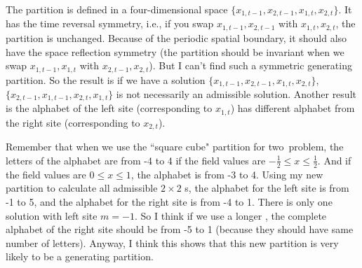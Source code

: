 \begin{description}
{The partition is defined in a four-dimensional space
$\{x_{1,t-1},x_{2,t-1},x_{1,t},x_{2,t}\}$. It has the time reversal
symmetry, i.e., if you swap $x_{1,t-1},x_{2,t-1}$ with $x_{1,t},x_{2,t}$,
the partition is unchanged. Because of the periodic spatial boundary, it
should also have the space reflection symmetry (the partition should be
invariant when we swap $x_{1,t-1},x_{1,t}$ with $x_{2,t-1},x_{2,t}$). But
I can't find such a symmetric generating partition. So the result is if
we have a solution $\{x_{1,t-1},x_{2,t-1},x_{1,t},x_{2,t}\}$,
$\{x_{2,t-1},x_{1,t-1},x_{2,t},x_{1,t}\}$ is not necessarily an
admissible solution. Another result is the alphabet of the left site
(corresponding to $x_{1,t}$) has different alphabet from the right site
(corresponding to $x_{2,t}$).

Remember that when we use the ``square cube" partition for two\dmn\
problem, the letters of the alphabet are from -4 to 4 if the field values
are $-\frac{1}{2}\leq x \leq \frac{1}{2}$. And if the field values are
$0\leq x \leq 1$, the alphabet is from -3 to 4. Using my new partition to
calculate all admissible $2\times 2$ {\brick s}, the alphabet for the
left site is from -1 to 5, and the alphabet for the right site is from -4
to 1. There is only one solution with left site $m=-1$. So I think if we
use a longer {\brick}, the complete alphabet of the right site should be
from -5 to 1 (because they should have same number of letters). Anyway, I
think this shows that this new partition is very likely to be a
generating partition.
}


\end{description}
